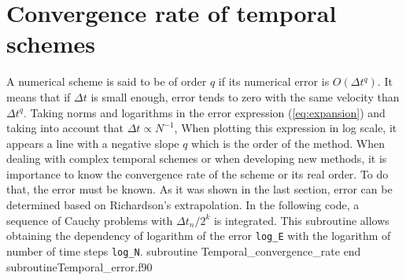 
 \newpage 
 \section{Convergence rate of temporal schemes}
 A numerical scheme is said to be of order $ q $ if its numerical error is $ O(\Delta t ^q) $. 
 It means that if $ \Delta t $ is small enough,  error tends to zero with the same velocity than  $ \Delta t ^q $. 
 Taking norms and logarithms in the error expression (\ref{eq:expansion}) and taking into account that $ \Delta t \propto N^{-1}$, 
 When plotting this expression in log scale, it appears a line with a negative slope $ q$ which is the order of the method. 
 When dealing with complex temporal schemes or when developing new methods, it is importance to know the convergence rate of the scheme or its real order. To do that, the error must be known. As it was shown in the  last section, error can be determined  based on Richardson's extrapolation. In the following code, a sequence of Cauchy problems  with $ \Delta t_n / 2^k $ is integrated. This subroutine allows obtaining the dependency of logarithm of the error \verb|log_E| with the logarithm of number of time steps \verb|log_N|.  
    \vspace{0.2cm} 
           {subroutine Temporal_convergence_rate}
           {end subroutine}{Temporal_error.f90} 
    
    
      
%  
  
 
 
 
      

              
  
  
       
%       
            
